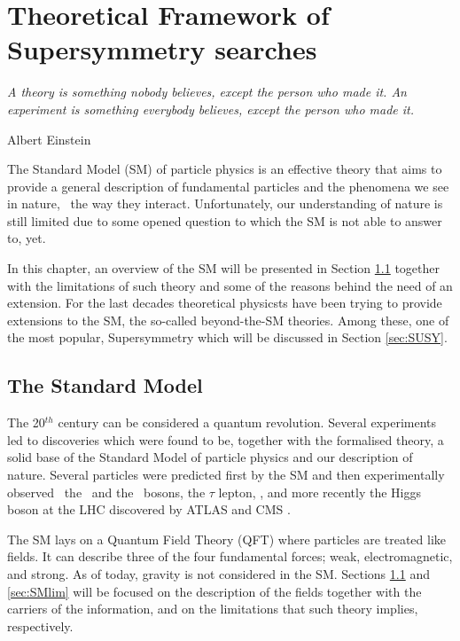 \chapter{Theoretical Framework of Supersymmetry searches}
\label{ch:theory} 
\epigraph{\emph{A theory is something nobody believes, except the person who made it. An experiment is something everybody believes, except the person who made it.}} {Albert Einstein}

	The Standard Model (SM) of particle physics is an effective theory that aims to provide a general description of fundamental particles and the phenomena we see in nature, \ie\ the way they interact. Unfortunately, our understanding of nature is still limited due to some opened question to which the SM is not able to answer to, yet. 

	In this chapter, an overview of the SM will be presented in Section \ref{sec:SMov} together with the limitations of such theory and some of the reasons behind the need of an extension. For the last decades theoretical physicsts have been trying to provide extensions to the SM, the so-called beyond-the-SM theories. Among these, one of the most popular, Supersymmetry which will be discussed in Section \ref{sec:SUSY}.  

	
	


	\section{The Standard Model}
	\label{sec:SMov}

		The 20$^{th}$ century can be considered a quantum revolution. Several experiments led to discoveries which were found to be, together with the formalised theory, a solid base of the Standard Model of particle physics and our description of nature. Several particles were predicted first by the SM and then experimentally observed \eg\ the \Wboson\ and the \Zboson\ bosons, the $\tau$ lepton, \cite{Herrero1998}, and more recently the Higgs boson at the LHC discovered by ATLAS \cite{ATLASHiggs2012} and CMS \cite{CMSHiggs2012}.

		The SM lays on a Quantum Field Theory (QFT) where particles are treated like fields. It can describe three of the four fundamental forces; weak, electromagnetic, and strong. As of today, gravity is not considered in the SM. Sections \ref{sec:SMov} and \ref{sec:SMlim} will be focused on the description of the fields together with the carriers of the information, and on the limitations that such theory implies, respectively.



